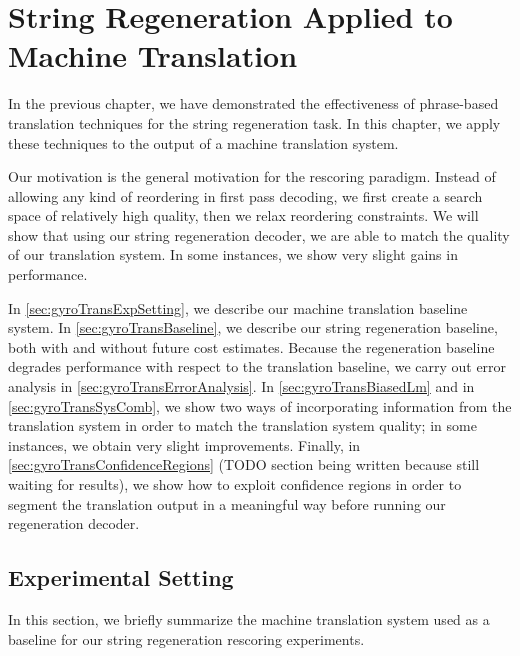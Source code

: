 \chapter{String Regeneration Applied to Machine Translation}
\label{chap:gyroTrans}


In the previous chapter, we
have demonstrated the effectiveness of phrase-based
translation techniques for the string regeneration task.
In this chapter, we apply these techniques to the output
of a machine translation system.

Our motivation is the general motivation for the rescoring paradigm.
Instead of allowing any kind of reordering in first pass
decoding, we first create a search space of relatively high
quality, then we relax reordering constraints.
We will show that using our string regeneration decoder,
we are able to match the quality of our translation
system. In some instances, we show very slight gains in
performance.

In \autoref{sec:gyroTransExpSetting}, we describe
our machine translation baseline system.
In \autoref{sec:gyroTransBaseline}, we describe
our string regeneration baseline, both with and without
future cost estimates. Because the regeneration baseline
degrades performance with respect to the translation
baseline, we carry out error analysis
in \autoref{sec:gyroTransErrorAnalysis}.
In \autoref{sec:gyroTransBiasedLm} and
in \autoref{sec:gyroTransSysComb}, we show two ways of incorporating
information from the translation system in order to match
the translation system quality; in some instances,
we obtain very slight improvements.
Finally, in \autoref{sec:gyroTransConfidenceRegions} (TODO section being written
because still waiting for results), we show
how to exploit confidence regions in order to segment
the translation output in a meaningful way before running
our regeneration decoder.

\section{Experimental Setting}
\label{sec:gyroTransExpSetting}

In this section, we briefly summarize the machine translation
system used as a baseline for our string regeneration rescoring
experiments.

